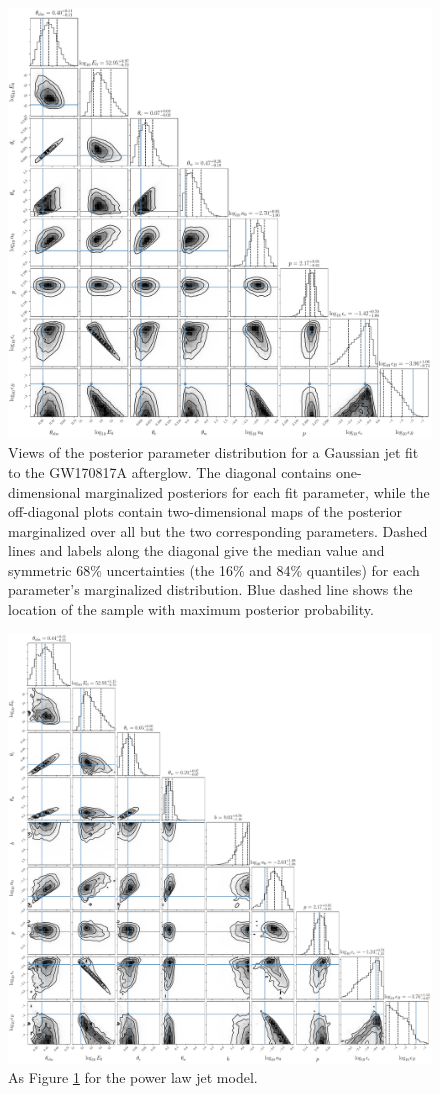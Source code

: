\documentclass[twocolumn]{aastex62}
\newcommand{\gwbns}{GW170817A}
\begin{document}
\begin{figure}
	\includegraphics[width=\textwidth]{figs/cornerGaussian.pdf}
	\caption{Views of the posterior parameter distribution for a Gaussian jet fit to the \gwbns{} afterglow.  The diagonal contains one-dimensional marginalized posteriors for each fit parameter, while the off-diagonal plots contain two-dimensional maps of the posterior marginalized over all but the two corresponding parameters. Dashed lines and labels along the diagonal give the median value and symmetric 68\% uncertainties (the 16\% and 84\% quantiles) for each parameter's marginalized distribution.  Blue dashed line shows the location of the sample with maximum posterior probability. \label{fig:cornerGaussian}}
\end{figure}

\begin{figure}
	\includegraphics[width=\textwidth]{figs/cornerPowerlaw.pdf}
	\caption{As Figure \ref{fig:cornerGaussian} for the power law jet model. \label{fig:cornerPowerlaw}}
\end{figure}


\end{document}
